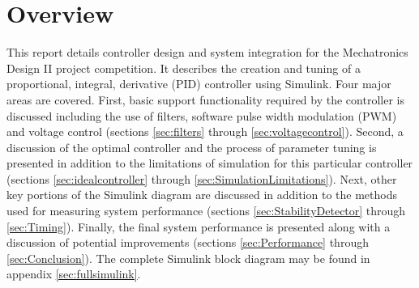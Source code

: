 \section{Overview}

This report details controller design and system integration for the Mechatronics Design II project competition.
It describes the creation and tuning of a  proportional, integral, derivative (PID) controller using Simulink.
Four major areas are covered.
First, basic support functionality required by the controller is discussed including the use of filters, software pulse width modulation (PWM) and voltage control (sections \ref{sec:filters} through \ref{sec:voltagecontrol}).
Second, a discussion of the optimal controller and the process of parameter tuning is presented in addition to the limitations of simulation for this particular controller (sections \ref{sec:idealcontroller} through \ref{sec:SimulationLimitations}). 
Next, other key portions of the Simulink diagram are discussed in addition to the methods used for measuring system performance (sections \ref{sec:StabilityDetector} through \ref{sec:Timing}).
Finally, the final system performance is presented along with a discussion of potential improvements (sections \ref{sec:Performance} through \ref{sec:Conclusion}).
The complete Simulink block diagram may be found in appendix \ref{sec:fullsimulink}.

